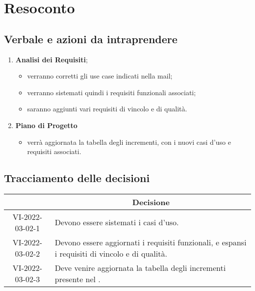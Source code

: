 \section{Resoconto}
\subsection{Verbale e azioni da intraprendere}

\begin{enumerate}
	\item \textbf{Analisi dei Requisiti};
	\begin{itemize}
		\item verranno corretti gli use case indicati nella mail;
		\item verranno sistemati quindi i requisiti funzionali associati;
		\item saranno aggiunti vari requisiti di vincolo e di qualità.
	\end{itemize}
	\item \textbf{Piano di Progetto}
	\begin{itemize}
		\item verrà aggiornata la tabella degli incrementi, con i nuovi casi d'uso e requisiti associati.
	\end{itemize}
\end{enumerate}

\pagebreak

\subsection{Tracciamento delle decisioni}

\begin{table}[H]
	\centering
	\renewcommand{\arraystretch}{1.8}
	\begin{tabular}{c | p{10cm}}
		\rowcolor[HTML]{125E28}
		\multicolumn{1}{c}{\color[HTML]{FFFFFF} \textbf{ID}} &
		\multicolumn{1}{c}{\color[HTML]{FFFFFF} \textbf{Decisione}} \\
		\hline
		VI-2022-03-02-1 & Devono essere sistemati i casi d'uso. \\ \hline
		VI-2022-03-02-2 & Devono essere aggiornati i requisiti funzionali, e espansi i requisiti di vincolo e di qualità. \\ \hline
		VI-2022-03-02-3 & Deve venire aggiornata la tabella degli incrementi presente nel \docNamePdP.\\
	\end{tabular}
\end{table}